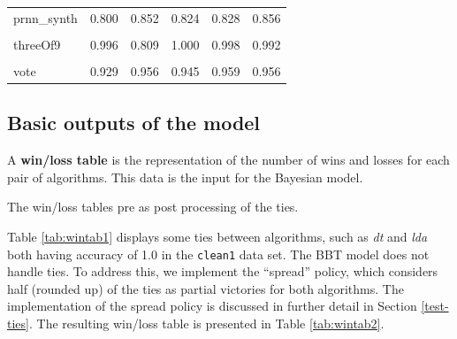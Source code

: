 \documentclass[twoside,11pt,preprint]{article}
\begin{document}
\begin{table}
\begin{tabular}[t]{lrrrrr}
\addlinespace
prnn\_synth & 0.800 & 0.852 & 0.824 & 0.828 & 0.856\\
\cellcolor{gray!6}{saheart} & \cellcolor{gray!6}{0.626} & \cellcolor{gray!6}{0.723} & \cellcolor{gray!6}{0.660} & \cellcolor{gray!6}{0.671} & \cellcolor{gray!6}{0.712}\\
threeOf9 & 0.996 & 0.809 & 1.000 & 0.998 & 0.992\\
\cellcolor{gray!6}{tokyo1} & \cellcolor{gray!6}{0.902} & \cellcolor{gray!6}{0.920} & \cellcolor{gray!6}{0.928} & \cellcolor{gray!6}{0.926} & \cellcolor{gray!6}{0.931}\\
vote & 0.929 & 0.956 & 0.945 & 0.959 & 0.956\\
\bottomrule
\end{tabular}
\end{table}

\hypertarget{basic-outputs-of-the-model}{%
\subsection{\texorpdfstring{Basic outputs of the model \label{sec:out1}}{Basic outputs of the model }}\label{basic-outputs-of-the-model}}

A \textbf{win/loss table} is the representation of the number of wins and losses for each pair of algorithms.
This data is the input for the Bayesian model.

\begin{table}[ht]
\centering
{}\quad
{}
\caption{The win/loss tables pre as post processing of the ties.}
\end{table}

Table \ref{tab:wintab1} displays some ties between algorithms, such as \emph{dt} and \emph{lda}
both having accuracy of 1.0 in the \texttt{clean1} data set. The BBT model does not handle ties. To address this, we implement the ``spread'' policy, which considers half (rounded up) of the ties as partial victories for both algorithms. The implementation of the spread policy is discussed in further detail in Section \ref{test-ties}. The resulting win/loss table is presented in Table \ref{tab:wintab2}.
\end{document}
